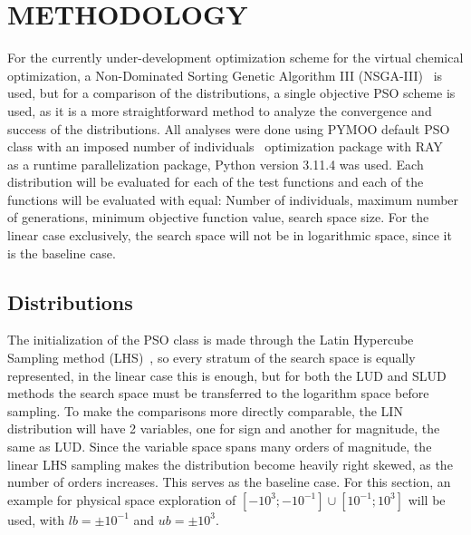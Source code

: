 \documentclass[10pt,fleqn,a4paper,twoside]{article}
\begin{document}
\section{METHODOLOGY}

For the currently under-development optimization scheme for the virtual chemical optimization, a Non-Dominated Sorting Genetic Algorithm III (NSGA-III)~\citep{Deb2014} is used, but for a comparison of the distributions, a single objective PSO scheme is used, as it is a more straightforward method to analyze the convergence and success of the distributions.
All analyses were done using PYMOO default PSO class with an imposed number of individuals~\citep{pymoo} optimization package with RAY~\citep{Ray2018} as a runtime parallelization package, Python version 3.11.4 was used. Each distribution will be evaluated
for each of the test functions and each of the functions will be evaluated with equal: Number of individuals, maximum number of generations, minimum objective function value,
search space size. For the linear case exclusively, the search space will not be in logarithmic space, since it is the baseline case.

\subsection{Distributions}
The initialization of the PSO class is made through the Latin Hypercube Sampling method (LHS)~\citep{McKay1979}, so every stratum of the search space is equally represented, in the linear case this is enough, but for both the 
LUD and SLUD methods the search space must be transferred to the logarithm space before sampling. To make the comparisons more directly comparable, the LIN distribution will have 2 variables, one for sign and another for 
magnitude, the same as LUD. Since the variable space spans many orders of magnitude, the linear LHS sampling makes the distribution become heavily right skewed, as the number of orders increases. This serves
as the baseline case. For this section, an example for physical space exploration of $[-10^3; -10^{-1}] \cup [10^{-1}; 10^{3}] $ will be used, with $lb = \pm 10^{-1}$ and $ub = \pm 10^{3}$.
\end{document}
